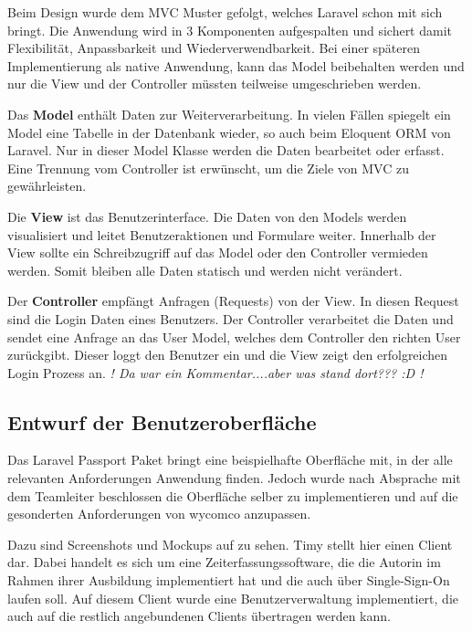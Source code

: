 Beim Design wurde dem \ac{MVC} Muster gefolgt, welches Laravel schon mit sich bringt. Die Anwendung wird in 3 Komponenten aufgespalten und sichert damit Flexibilität, Anpassbarkeit und Wiederverwendbarkeit.
Bei einer späteren Implementierung als native Anwendung, kann das Model beibehalten werden und nur die View und der Controller müssten teilweise umgeschrieben werden.

Das \textbf{Model} enthält Daten zur Weiterverarbeitung. In vielen Fällen spiegelt ein Model
eine Tabelle in der Datenbank wieder, so auch beim Eloquent \ac{ORM} von Laravel. Nur in dieser Model Klasse werden die Daten bearbeitet oder erfasst. Eine Trennung vom Controller ist erwünscht, um die Ziele von \ac{MVC} zu gewährleisten.

Die \textbf{View} ist das Benutzerinterface. Die Daten von den Models werden visualisiert und leitet \zB Benutzeraktionen und Formulare weiter. Innerhalb der View sollte ein Schreibzugriff auf das Model oder den Controller vermieden werden. Somit bleiben alle Daten statisch und werden nicht verändert.

Der \textbf{Controller} empfängt Anfragen (Requests) von der View. In diesen Request sind \bspw die Login Daten eines Benutzers. Der Controller verarbeitet die Daten und sendet eine Anfrage an das User Model, welches dem Controller den richten User zurückgibt. Dieser loggt den Benutzer ein und die View zeigt den erfolgreichen Login Prozess an. 
\textit{! Da war ein Kommentar....aber was stand dort??? :D !}

\subsection{Entwurf der Benutzeroberfläche}
\label{sec:Benutzeroberflaeche} 

Das Laravel Passport Paket bringt eine beispielhafte Oberfläche mit, in der alle relevanten Anforderungen Anwendung finden. Jedoch wurde nach Absprache mit dem Teamleiter beschlossen die Oberfläche selber zu implementieren und auf die gesonderten Anforderungen von wycomco  anzupassen.

Dazu sind Screenshots und Mockups auf   zu sehen. Timy stellt hier einen Client dar. Dabei handelt es sich um eine Zeiterfassungssoftware, die die Autorin im Rahmen ihrer Ausbildung implementiert hat und die auch über Single-Sign-On laufen soll. Auf diesem Client wurde eine Benutzerverwaltung implementiert, die auch auf die restlich angebundenen Clients übertragen werden kann. 

